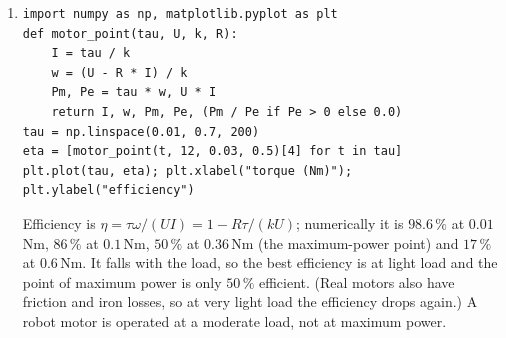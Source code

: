 \begin{enumerate}[label=\textbf{\ansnum.\arabic*}]
  \item[\textbf{\ansnum.10}]
\begin{verbatim}
import numpy as np, matplotlib.pyplot as plt
def motor_point(tau, U, k, R):
    I = tau / k
    w = (U - R * I) / k
    Pm, Pe = tau * w, U * I
    return I, w, Pm, Pe, (Pm / Pe if Pe > 0 else 0.0)
tau = np.linspace(0.01, 0.7, 200)
eta = [motor_point(t, 12, 0.03, 0.5)[4] for t in tau]
plt.plot(tau, eta); plt.xlabel("torque (Nm)"); plt.ylabel("efficiency")
\end{verbatim}
  Efficiency is $\eta=\tau\omega/(UI)=1-R\tau/(kU)$; numerically it is $98.6\,\%$ at $0.01$\,Nm, $86\,\%$ at $0.1$\,Nm, $50\,\%$ at $0.36$\,Nm (the maximum-power point) and $17\,\%$ at $0.6$\,Nm. It falls with the load, so the best efficiency is at light load and the point of maximum power is only $50\,\%$ efficient. (Real motors also have friction and iron losses, so at very light load the efficiency drops again.) A robot motor is operated at a moderate load, not at maximum power.
\end{enumerate}
